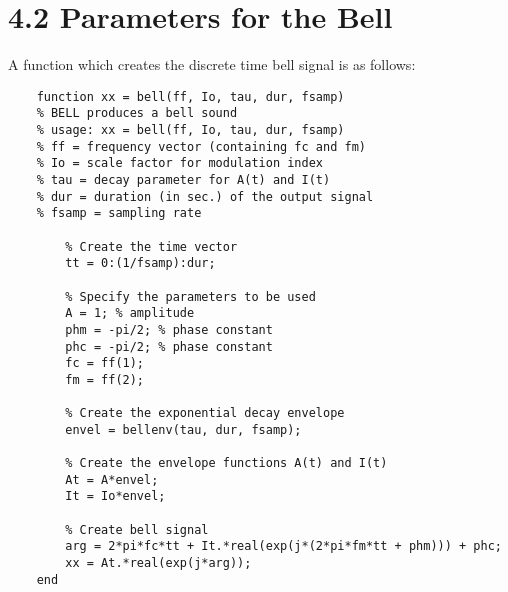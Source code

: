 \documentclass{article}
\begin{document}
\section{4.2 Parameters for the Bell}
A function which creates the discrete time bell signal is as follows:
\begin{lstlisting}
	function xx = bell(ff, Io, tau, dur, fsamp)
	% BELL produces a bell sound
	% usage: xx = bell(ff, Io, tau, dur, fsamp)
	% ff = frequency vector (containing fc and fm)
	% Io = scale factor for modulation index
	% tau = decay parameter for A(t) and I(t)
	% dur = duration (in sec.) of the output signal
	% fsamp = sampling rate
	    
	    % Create the time vector
	    tt = 0:(1/fsamp):dur;
	    
	    % Specify the parameters to be used
	    A = 1; % amplitude
	    phm = -pi/2; % phase constant
	    phc = -pi/2; % phase constant
	    fc = ff(1);
	    fm = ff(2);
	    
	    % Create the exponential decay envelope
	    envel = bellenv(tau, dur, fsamp);
	    
	    % Create the envelope functions A(t) and I(t)
	    At = A*envel;
	    It = Io*envel;
	    
	    % Create bell signal
	    arg = 2*pi*fc*tt + It.*real(exp(j*(2*pi*fm*tt + phm))) + phc;
	    xx = At.*real(exp(j*arg));
	end
\end{lstlisting}
\end{document}
